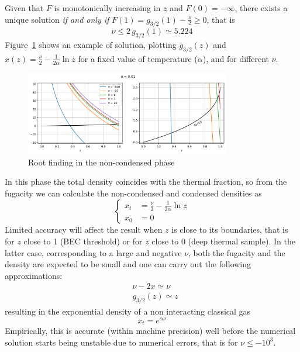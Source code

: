 \documentclass{article}
\begin{document}
Given that $F$ is monotonically increasing in $z$ and $F(0) = -\infty$, there exists a unique solution \textit{if and only if} $F(1) = g_{3/2}(1) - \frac{\nu}{2} \geq 0$, that is
\begin{equation}
  \nu \leq 2\,g_{3/2}(1) \simeq 5.224
\end{equation}
Figure~\ref{fig:solve_noncond} shows an example of solution, plotting $g_{3/2}(z)$ and $x(z) = \frac{\nu}{2} - \frac{1}{2\alpha}\ln z$ for a fixed value of temperature ($\alpha$), and for different $\nu$.
\begin{figure}
  \centering
  \includegraphics[width=0.8\textwidth]{figures/fig_solve_noncond}
  \caption{Root finding in the non-condensed phase}
  \label{fig:solve_noncond}
\end{figure}
In this phase the total density coincides with the thermal fraction, so from the fugacity we can calculate the non-condensed and condensed densities as
\begin{equation}
  \left\{
  \begin{aligned}
    x_t &= \frac{\nu}{2} - \frac{1}{2\alpha}\ln z \\
    x_0 &= 0
  \end{aligned}
  \right.
\end{equation}
Limited accuracy will affect the result when $z$ is close to its boundaries, that is for $z$ close to 1 (BEC threshold) or for $z$ close to 0 (deep thermal sample). In the latter case, corresponding to a large and negative $\nu$, both the fugacity and the density are expected to be small and one can carry out the following approximations:
\begin{align*}
  &\nu - 2x \simeq \nu \\
  &g_{3/2}(z) \simeq z
\end{align*}
resulting in the exponential density of a non interacting classical gas
\begin{equation}
  x_t = e^{\alpha \nu}
\end{equation}
Empirically, this is accurate (within machine precision) well before the numerical solution starts being unstable due to numerical errors, that is for $\nu \leq -10^3$.
\end{document}
